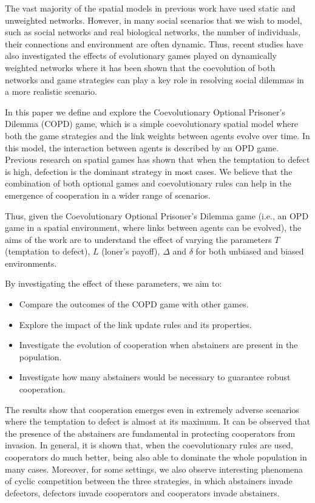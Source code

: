\documentclass{llncs}
\begin{document}
The vast majority of the spatial models in previous work have used static and
unweighted networks. However, in many social scenarios that we wish to model,
such as social networks and real biological networks, the number of
individuals, their connections and environment are often dynamic. Thus, recent
studies have also investigated the effects of evolutionary games played on
dynamically weighted networks
\cite{Huang2015,Wang2014,Cao2011,Szolnoki2009,Zimmermann2004} where it has
been shown that the coevolution of both networks and game strategies can play a
key role in resolving social dilemmas in a more realistic scenario.

In this paper we define and explore the Coevolutionary Optional Prisoner's
Dilemma (COPD) game, which is a simple coevolutionary spatial model where both
the game strategies and the link weights between agents evolve over time. In
this model, the interaction between agents is described by an OPD game.
Previous research on spatial games has shown that when the temptation to defect
is high, defection is the dominant strategy in most cases. We believe that the
combination of both optional games and coevolutionary rules can help in the
emergence of cooperation in a wider range of scenarios.

Thus, given the Coevolutionary Optional Prisoner's Dilemma game (i.e., an OPD
game in a spatial environment, where links between agents can be evolved), the
aims of the work are to understand the effect of varying the parameters $T$
(temptation to defect), $L$ (loner's payoff), $\Delta$ and $\delta$ for both
unbiased and biased environments.

By investigating the effect of these parameters, we aim to:
\begin{itemize}
    \item Compare the outcomes of the COPD game with other games.

    \item Explore the impact of the link update rules and its properties.

    \item Investigate the evolution of cooperation when abstainers are present
        in the population.

    \item Investigate how many abstainers would be necessary to guarantee
        robust cooperation.
\end{itemize}

The results show that cooperation emerges even in extremely adverse scenarios
where the temptation to defect is almost at its maximum. It can be observed
that the presence of the abstainers are fundamental in protecting cooperators
from invasion. In general, it is shown that, when the coevolutionary rules are
used, cooperators do much better, being also able to dominate the whole
population in many cases. Moreover, for some settings, we also observe
interesting phenomena of cyclic competition between the three strategies, in
which abstainers invade defectors, defectors invade cooperators and cooperators
invade abstainers.
\end{document}
